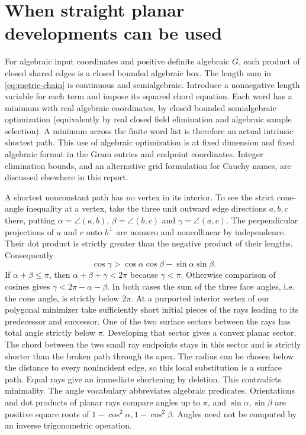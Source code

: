\documentclass[10pt,letterpaper]{article}
\begin{document}
\section{When straight planar developments can be used}
\label{sec:legal-nets}

For algebraic input coordinates and positive definite algebraic $G$,
each product of closed shared edges is a closed bounded algebraic box.
The length sum in \eqref{eq:metric-chain} is continuous and
semialgebraic. Introduce a nonnegative length variable for each term
and impose its squared chord equation. Each word has a minimum with
real algebraic coordinates, by closed bounded semialgebraic
optimization (equivalently by real closed field elimination and
algebraic sample selection). A minimum across the finite word list
is therefore an actual intrinsic shortest path. This use of algebraic
optimization is at fixed dimension and fixed algebraic format in the
Gram entries and endpoint coordinates. Integer elimination bounds,
and an alternative grid formulation for Cauchy names, are discussed
elsewhere in this report.

A shortest nonconstant path has no vertex in its interior. To see the
strict cone-angle inequality at a vertex, take the three unit outward
edge directions $a,b,c$ there, putting
$\alpha=\angle(a,b)$, $\beta=\angle(b,c)$ and
$\gamma=\angle(a,c)$. The perpendicular projections of $a$ and $c$
onto $b^\perp$ are nonzero and noncollinear by independence. Their dot
product is strictly greater than the negative product of their lengths.
Consequently
\[
  \cos\gamma>\cos\alpha\cos\beta-\sin\alpha\sin\beta.
\]
If $\alpha+\beta\le\pi$, then
$\alpha+\beta+\gamma<2\pi$ because $\gamma<\pi$.
Otherwise comparison of cosines gives
$\gamma<2\pi-\alpha-\beta$. In both cases the sum of the three face
angles, i.e. the cone angle, is strictly below $2\pi$. At a purported
interior vertex of our polygonal minimizer take sufficiently short
initial pieces of the rays leading to its predecessor and successor.
One of the two surface sectors between the rays has total angle
strictly below $\pi$. Developing that sector gives a convex planar
sector. The chord between the two small ray endpoints stays in this
sector and is strictly shorter than the broken path through its
apex. The radius can be chosen below the distance to every
nonincident edge, so this local substitution is a surface path.
Equal rays give an immediate shortening by deletion. This contradicts
minimality. The angle vocabulary abbreviates algebraic predicates. Orientations and dot products of planar rays compare angles up to
$\pi$, and $\sin\alpha,\sin\beta$ are positive square roots of
$1-\cos^2\alpha,1-\cos^2\beta$. Angles need not be computed by an
inverse trigonometric operation.
\end{document}

